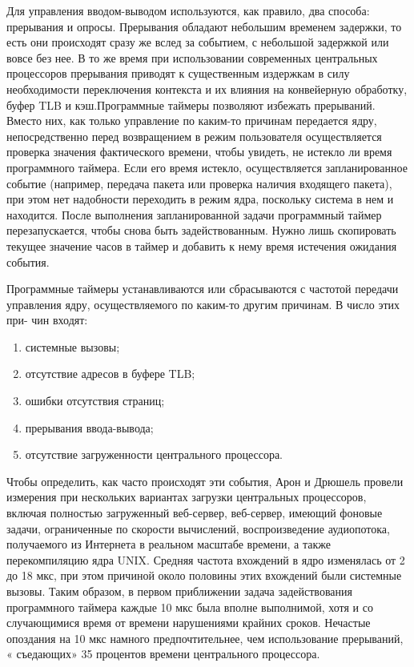 Для управления вводом-выводом используются, как правило, два способа: прерывания
и опросы. Прерывания обладают небольшим временем задержки, то есть они происходят сразу же вслед за событием, с небольшой задержкой или вовсе без нее. В то же
время при использовании современных центральных процессоров прерывания приводят к существенным издержкам в силу необходимости переключения контекста и их
влияния на конвейерную обработку, буфер TLB и кэш.Программные таймеры позволяют избежать прерываний. Вместо них, как только управление по каким-то причинам передается ядру, непосредственно перед возвращением в режим пользователя осуществляется проверка значения фактического времени,
чтобы увидеть, не истекло ли время программного таймера. Если его время истекло, осуществляется запланированное событие (например, передача пакета или проверка наличия входящего пакета), при этом нет надобности переходить в режим ядра, поскольку
система в нем и находится. После выполнения запланированной задачи программный
таймер перезапускается, чтобы снова быть задействованным. Нужно лишь скопировать
текущее значение часов в таймер и добавить к нему время истечения ожидания события.

Программные таймеры устанавливаются или сбрасываются с частотой передачи
управления ядру, осуществляемого по каким-то другим причинам. В число этих при-
чин входят:

\begin{enumerate}
  \item системные вызовы;
  \item отсутствие адресов в буфере TLB;
  \item ошибки отсутствия страниц;
  \item прерывания ввода-вывода;
  \item отсутствие загруженности центрального процессора.
\end{enumerate}

Чтобы определить, как часто происходят эти события, Арон и Дрюшель провели измерения при нескольких вариантах загрузки центральных процессоров, включая полностью загруженный веб-сервер, веб-сервер, имеющий фоновые задачи, ограниченные
по скорости вычислений, воспроизведение аудиопотока, получаемого из Интернета
в реальном масштабе времени, а также перекомпиляцию ядра UNIX. Средняя частота
вхождений в ядро изменялась от 2 до 18 мкс, при этом причиной около половины
этих вхождений были системные вызовы. Таким образом, в первом приближении задача задействования программного таймера каждые 10 мкс была вполне выполнимой,
хотя и со случающимися время от времени нарушениями крайних сроков. Нечастые
опоздания на 10 мкс намного предпочтительнее, чем использование прерываний,
« съедающих» 35 процентов времени центрального процессора.

